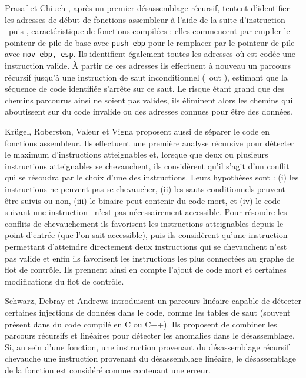 Prasaf et Chiueh \cite{PC03}, après un premier désassemblage récursif, tentent d'identifier les adresses de début de fonctions assembleur à l'aide de la suite d'instruction \push\ puis \mov, caractéristique de fonctions compilées : elles commencent par empiler le pointeur de pile de base avec \texttt{push ebp} pour le remplacer par le pointeur de pile avec \texttt{mov ebp, esp}. Ils identifient également toutes les adresses où est codée une instruction valide. À partir de ces adresses ils effectuent à nouveau un parcours récursif jusqu'à une instruction de saut inconditionnel (\ret\ out \jmp), estimant que la séquence de code identifiée s'arrête sur ce saut. Le risque étant grand que des chemins parcourus ainsi ne soient pas valides, ils éliminent alors les chemins qui aboutissent sur du code invalide ou des adresses connues pour être des données.

Krügel, Roberston, Valeur et Vigna \cite{KruegelRVV04} proposent aussi de séparer le code en fonctions assembleur. Ils effectuent une première analyse récursive pour détecter le maximum d'instructions atteignables et, lorsque que deux ou plusieurs instructions atteignables se chevauchent, ils considèrent qu'il s'agit d'un conflit qui se résoudra par le choix d'une des instructions.
Leurs hypothèses sont : (i) les instructions ne peuvent pas se chevaucher, (ii) les sauts conditionnels peuvent être suivis ou non, (iii) le binaire peut contenir du code mort, et (iv) le code suivant une instruction \call\ n'est pas nécessairement accessible. Pour résoudre les conflits de chevauchement ils favorisent les instructions atteignables depuis le point d'entrée (que l'on sait accessible), puis ils considèrent qu'une instruction permettant d'atteindre directement deux instructions qui se chevauchent n'est pas valide et enfin ils favorisent les instructions les plus connectées au graphe de flot de contrôle.
Ils prennent ainsi en compte l'ajout de code mort et certaines modifications du flot de contrôle.

Schwarz, Debray et Andrews \cite{SDA02} introduisent un parcours linéaire capable de détecter certaines injections de données dans le code, comme les tables de saut (souvent présent dans du code compilé en C ou C++). Ils proposent de combiner les parcours récursifs et linéaires pour détecter les anomalies dans le désassemblage. Si, au sein d'une fonction, une instruction provenant du désassemblage récursif chevauche une instruction provenant du désassemblage linéaire, le désassemblage de la fonction est considéré comme contenant une erreur.

